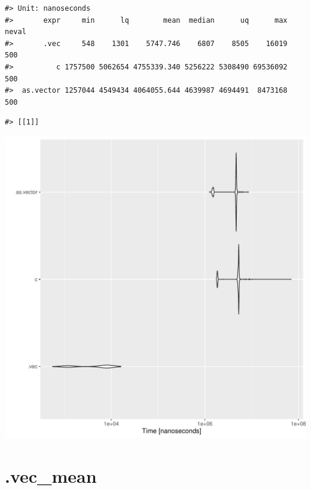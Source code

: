 \documentclass{article}\usepackage[]{graphicx}\usepackage[]{color}
\makeatletter
\newenvironment{kframe}{%
 \def\at@end@of@kframe{}%
 \ifinner\ifhmode%
  \def\at@end@of@kframe{\end{minipage}}%
  \begin{minipage}{\columnwidth}%
 \fi\fi%
 \def\FrameCommand##1{\hskip\@totalleftmargin \hskip-\fboxsep
 \colorbox{shadecolor}{##1}\hskip-\fboxsep
     \hskip-\linewidth \hskip-\@totalleftmargin \hskip\columnwidth}%
 \MakeFramed {\advance\hsize-\width
   \@totalleftmargin\z@ \linewidth\hsize
   \@setminipage}}%
 {\par\unskip\endMakeFramed%
 \at@end@of@kframe}
\newenvironment{knitrout}{}{} %
\makeatother
\begin{document}
\begin{knitrout}
\color{fgcolor}\begin{kframe}
\begin{verbatim}
#> Unit: nanoseconds
#>       expr     min      lq        mean  median      uq      max neval
#>       .vec     548    1301    5747.746    6807    8505    16019   500
#>          c 1757500 5062654 4755339.340 5256222 5308490 69536092   500
#>  as.vector 1257044 4549434 4064055.644 4639987 4694491  8473168   500
\end{verbatim}


{\ttfamily\noindent\itshape\color{messagecolor}{\#> Coordinate system already present. Adding new coordinate system, which will replace the existing one.}}\begin{verbatim}
#> [[1]]
\end{verbatim}
\end{kframe}
\includegraphics[width=1\linewidth]{man/figures/latex-test-benchmark-linearAlgebra-vec-dot-1} 

\end{knitrout}

\newpage

\section{.vec\_mean}
\end{document}
